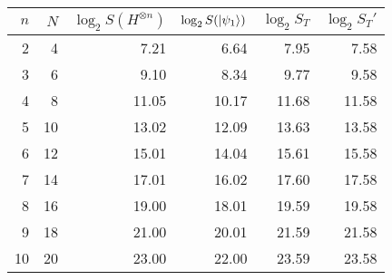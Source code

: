 \begin{tabular}{rrrrrr}
\toprule
	 $n$ &   $N$ &   $\log_2 S(H^{\otimes n})$ &   $\log_2 S(\ket{\psi_1})$ &   
$\log_2 S_T$ &   $\log_2 S_T'$ \\
\midrule
     2 &     4 &            7.21 &                       6.64 &           7.95 &            7.58 \\
     3 &     6 &            9.10 &                       8.34 &           9.77 &            9.58 \\
     4 &     8 &           11.05 &                      10.17 &          11.68 &           11.58 \\
     5 &    10 &           13.02 &                      12.09 &          13.63 &           13.58 \\
     6 &    12 &           15.01 &                      14.04 &          15.61 &           15.58 \\
     7 &    14 &           17.01 &                      16.02 &          17.60 &           17.58 \\
     8 &    16 &           19.00 &                      18.01 &          19.59 &           19.58 \\
     9 &    18 &           21.00 &                      20.01 &          21.59 &           21.58 \\
    10 &    20 &           23.00 &                      22.00 &          23.59 &           23.58 \\
\bottomrule
\end{tabular}
